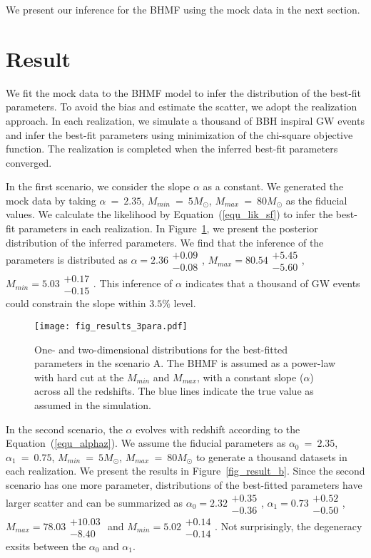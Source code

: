 \documentclass[twocolumn]{aastex62}
\begin{document}
 We present our inference for the BHMF using the mock data in the next section. 


\vspace{1cm}
\section{Result}\label{sec_result}
We fit the mock data to the BHMF model to infer the distribution of the best-fit parameters. To avoid the bias and estimate the scatter, we adopt the realization approach. %
In each realization, we simulate a thousand of BBH inspiral GW events and infer the best-fit parameters using minimization of the chi-square objective function. 
The realization is completed when the inferred best-fit parameters converged.

In the first scenario, we consider the slope $\alpha$ as a constant. We generated the mock data by taking $\alpha~=~2.35$, $M_{min}~=~5M_{\odot}$, $M_{max}~=~80M_{\odot}$ as the fiducial values. We calculate the likelihood by Equation~(\ref{equ_lik_sf}) to infer the best-fit parameters in each realization. In Figure~\ref{fig_result_a}, we present the posterior distribution of the inferred parameters. We find that the inference of the parameters is distributed as $\alpha = 2.36\substack{+0.09\\-0.08}$, $M_{max} = 80.54\substack{+5.45\\-5.60}$,  $M_{min} = 5.03\substack{+0.17\\-0.15}$. This inference of $\alpha$ indicates that a thousand of GW events could constrain the slope within $3.5\%$ level.

\begin{figure}%
\texttt{[image: fig\_results\_3para.pdf]}
\caption{
One- and two-dimensional distributions for the best-fitted parameters in the scenario A. The BHMF is assumed as a power-law with hard cut at the $M_{min}$ and $M_{max}$, with a constant slope ($\alpha$) across all the redshifts. The blue lines indicate the true value as assumed in the simulation.
}
\label{fig_result_a}
\end{figure}

In the second scenario, the $\alpha$ evolves with redshift according to the Equation~(\ref{equ_alphaz}). We assume the fiducial parameters as $\alpha_0~=~2.35$, $\alpha_1~=~0.75$, $M_{min}~=~5M_{\odot}$, $M_{max}~=~80M_{\odot}$ to generate a thousand datasets in each realization. We present the results in Figure~\ref{fig_result_b}. Since the second scenario has one more parameter, distributions of the best-fitted parameters have larger scatter and can be summarized as $\alpha_0 = 2.32\substack{+0.35\\-0.36}$, $\alpha_1 = 0.73\substack{+0.52\\-0.50}$, $M_{max} = 78.03\substack{+10.03\\-8.40}$ and  $M_{min} = 5.02\substack{+0.14\\-0.14}$. Not surprisingly, the degeneracy exsits between the $\alpha_0$ and $\alpha_1$. 
\end{document}

